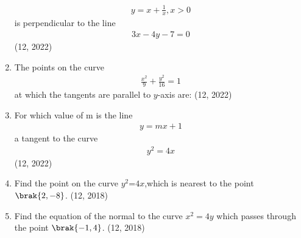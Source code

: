 \begin{enumerate}[label=\thesubsection.\arabic*,ref=\thesubsection.\theenumi]
\begin{align}
    y = x+\frac{1}{x}, x>0 
\end{align}
 is perpendicular to the line
 \begin{align}
     3x-4y-7 = 0 
 \end{align}
\hfill (12, 2022)
         \item The points on the curve
         \begin{align}
             \frac{x^2}{9} +\frac{y^2}{16} = 1
         \end{align}
         at which the tangents are parallel to $y$-axis are:
\hfill (12, 2022)
         \item For which value of m is the line
         \begin{align}
            y = mx + 1 
         \end{align}a tangent to the curve 
        \begin{align}
            y^2 = 4x 
        \end{align}
\hfill (12, 2022)
\item Find the point on the curve $y^2$=$4x$,which is nearest to the point $\brak{2,-8}$.  
\hfill (12, 2018)
\item Find the equation of the normal to the curve ${x}^2 = 4y$ which passes through the point $\brak{-1, 4}$.
\hfill (12, 2018)
\end{enumerate} 
